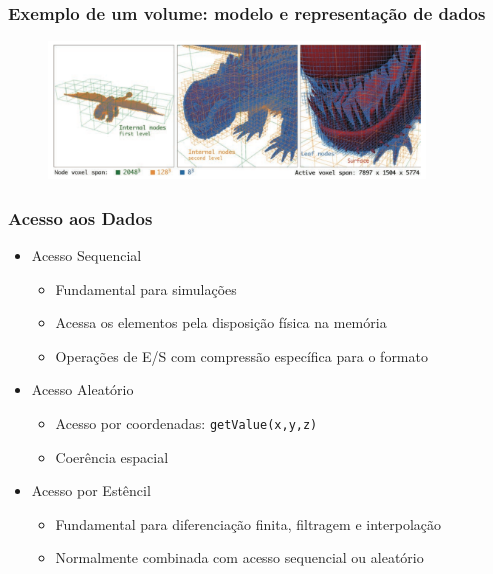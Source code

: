 \documentclass{beamer}
\begin{document}
\begin{frame}

\frametitle{Exemplo de um volume: modelo e representação de dados}

\begin{figure}[!htb]
\center
\includegraphics[width=10cm]{dragon}  
\label{vdbtree}
\end{figure}

\end{frame}

\begin{frame}

\frametitle{Acesso aos Dados}

\begin{itemize}
\item Acesso Sequencial
\begin{itemize}
\item Fundamental para simulações
\item Acessa os elementos pela disposição física na memória
\item Operações de E/S com compressão específica para o formato
\end{itemize}
\item Acesso Aleatório
\begin{itemize}
\item Acesso por coordenadas: \texttt{getValue(x,y,z)}
\item Coerência espacial
\end{itemize}
\item Acesso por Estêncil
\begin{itemize}
\item Fundamental para diferenciação finita, filtragem e interpolação
\item Normalmente combinada com acesso sequencial ou aleatório
\end{itemize}
\end{itemize}

\end{frame}
\end{document}
